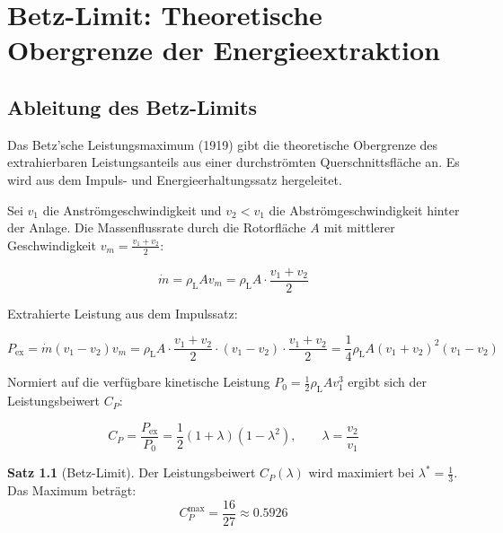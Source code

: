 ﻿\documentclass[12pt, a4paper]{report}
\theoremstyle{definition}
\newtheorem{theorem}{Satz}[section]
\theoremstyle{remark}
\newcommand{\rhoL}{\rho_{\text{L}}}
\begin{document}
\chapter{Betz-Limit: Theoretische Obergrenze der Energieextraktion}
\label{chap:betz}

\section{Ableitung des Betz-Limits}

Das Betz'sche Leistungsmaximum (1919) gibt die theoretische Obergrenze des
extrahierbaren Leistungsanteils aus einer durchströmten Querschnittsfläche an.
Es wird aus dem Impuls- und Energieerhaltungssatz hergeleitet.

Sei $v_1$ die Anströmgeschwindigkeit und $v_2 < v_1$ die Abströmgeschwindigkeit
hinter der Anlage. Die Massenflussrate durch die Rotorfläche $A$ mit
mittlerer Geschwindigkeit $v_m = \frac{v_1+v_2}{2}$:

\begin{equation}
  \dot{m} = \rhoL A v_m = \rhoL A \cdot \frac{v_1 + v_2}{2}
  \label{eq:massenstrom}
\end{equation}

Extrahierte Leistung aus dem Impulssatz:

\begin{equation}
  P_{\text{ex}} = \dot{m}(v_1 - v_2)v_m
  = \rhoL A \cdot \frac{v_1+v_2}{2} \cdot (v_1-v_2) \cdot \frac{v_1+v_2}{2}
  = \frac{1}{4}\rhoL A (v_1+v_2)^2(v_1-v_2)
  \label{eq:p_betz}
\end{equation}

Normiert auf die verfügbare kinetische Leistung $P_0 = \frac{1}{2}\rhoL A v_1^3$
ergibt sich der Leistungsbeiwert $C_P$:

\begin{equation}
  C_P = \frac{P_{\text{ex}}}{P_0} = \frac{1}{2}(1+\lambda)(1-\lambda^2),
  \qquad \lambda = \frac{v_2}{v_1}
  \label{eq:cp}
\end{equation}

\begin{theorem}[Betz-Limit]
  \label{thm:betz}
  Der Leistungsbeiwert $C_P(\lambda)$ wird maximiert bei
  $\lambda^* = \frac{1}{3}$. Das Maximum beträgt:
  \begin{equation}
    C_P^{\max} = \frac{16}{27} \approx 0.5926
    \label{eq:betz_max}
  \end{equation}
\end{theorem}
\end{document}
